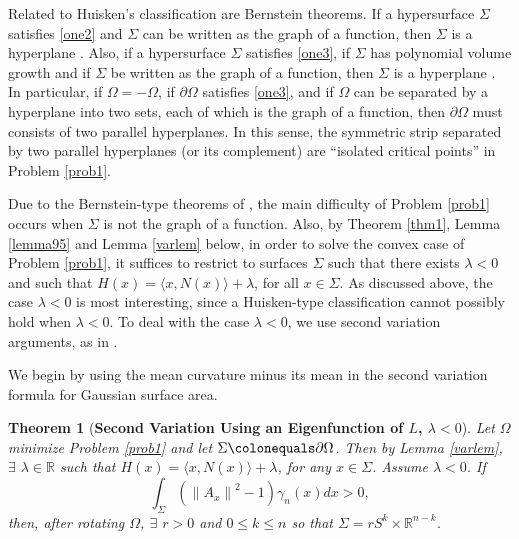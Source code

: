 \documentclass[12pt,reqno]{amsart}
\newtheorem{theorem}{Theorem}[section]
\theoremstyle{definition}
\newcommand{\vnormt}[1]{\left\|#1\right\|}    %
\newcommand{\R}{\mathbb{R}}
\newcommand{\embolden}[1]{\textbf {#1}}
\newcommand{\sdimn}{n}
\newcommand{\scon}{\lambda}
\newcommand{\pcon}{\delta}
\begin{document}
Related to Huisken's classification \cite{huisken90,huisken93} \cite[Theorem 0.17]{colding12a} are Bernstein theorems.  If a hypersurface $\Sigma$ satisfies \eqref{one2} and $\Sigma$ can be written as the graph of a function, then $\Sigma$ is a hyperplane \cite{ecker89} \cite{wang11}.  Also, if a hypersurface $\Sigma$ satisfies \eqref{one3}, if $\Sigma$ has polynomial volume growth and if $\Sigma$ be written as the graph of a function, then $\Sigma$ is a hyperplane \cite[Theorem 1.6]{guang15} \cite[Theorem 1.3]{cheng14}.  In particular, if $\Omega=-\Omega$, if $\partial\Omega$ satisfies \eqref{one3}, and if $\Omega$ can be separated by a hyperplane into two sets, each of which is the graph of a function, then $\partial\Omega$ must consists of two parallel hyperplanes.  In this sense, the symmetric strip separated by two parallel hyperplanes (or its complement) are ``isolated critical points'' in Problem \ref{prob1}.

Due to the Bernstein-type theorems of \cite{guang15,cheng14}, the main difficulty of Problem \ref{prob1} occurs when $\Sigma$ is not the graph of a function.  Also, by Theorem \ref{thm1}, Lemma \ref{lemma95} and Lemma \ref{varlem} below, in order to solve the convex case of Problem \ref{prob1}, it suffices to restrict to surfaces $\Sigma$ such that there exists $\scon<0$ and such that $H(x)=\langle x,N(x)\rangle+\scon$, for all $x\in\Sigma$.  As discussed above, the case $\scon<0$ is most interesting, since a Huisken-type classification cannot possibly hold when $\scon<0$.  To deal with the case $\scon<0$, we use second variation arguments, as in \cite{colding12a,colding12}.

We begin by using the mean curvature minus its mean in the second variation formula for Gaussian surface area.
%
\begin{theorem}[\embolden{Second Variation Using an Eigenfunction of $L$, $\scon<0$}]\label{thm2}
Let $\Omega$ minimize Problem \ref{prob1} and let $\Sigma\colonequals\partial\Omega$.  Then by Lemma \ref{varlem}, $\exists$ $\scon\in\R$ such that $H(x)=\langle x,N(x)\rangle+\scon$, for any $x\in\Sigma$.  Assume $\scon<0$.  If
$$\int_{\Sigma}(\vnormt{A_{x}}^{2}-1)\gamma_{\sdimn}(x)dx>0,$$
then, after rotating $\Omega$, $\exists$ $r>0$ and $0\leq k\leq \sdimn$ so that $\Sigma=r S^{k}\times\R^{\sdimn-k}$.
\end{theorem}
\end{document}
